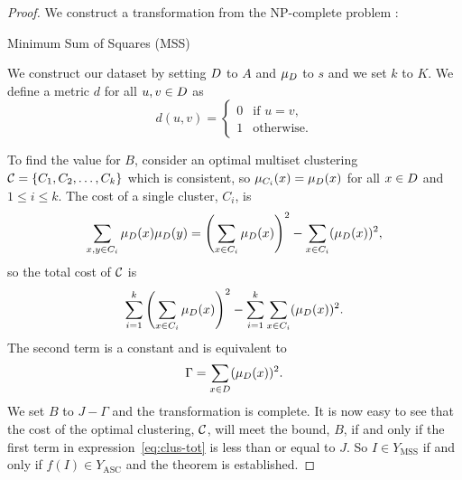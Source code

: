 \begin{proof}
  We construct a transformation from the NP-complete problem
  \citep{gareyjohnson79}:
  \begin{problem}{Minimum Sum of Squares (MSS)}
  \end{problem}
  We construct our dataset by setting $D$ to $A$ and $\mu_{D}$ to $s$
  and we set $k$ to $K$.  We define a metric $d$ for all $u,v \in D$ as
  \begin{equation*}
    d(u,v) =
    \begin{cases}
      0 & \text{if $u=v$,}\\
      1 & \text{otherwise.}
    \end{cases}
  \end{equation*}

  To find the value for $B$, consider an optimal multiset clustering
  $\mathcal{C}=\{C_1,C_2,\dotsc,C_k\}$ which is consistent, so
  $\mu_{C_i}(x)=\mu_{D}(x)$ for all $x \in D$ and $1 \leq i \leq k$.
  The cost of a single cluster, $C_i$, is
  \begin{equation*}
    \sum_{x,y \in C_i} \mu_{D}(x)\mu_{D}(y)
    = \left(\sum_{x \in C_i} \mu_{D}(x)\right)^2
    - \sum_{x \in C_i} (\mu_{D}(x))^2,
  \end{equation*}
  so the total cost of $\mathcal{C}$ is
  \begin{equation}
    \label{eq:clus-tot}
    \sum_{i=1}^{k}\left(\sum_{x \in C_i} \mu_{D}(x)\right)^2
    - \sum_{i=1}^{k}\sum_{x \in C_i} (\mu_{D}(x))^2.
  \end{equation}
  The second term is a constant and is equivalent to
  \begin{equation*}
    \Gamma = \sum_{x \in D} (\mu_{D}(x))^2.
  \end{equation*}
  We set $B$ to $J-\Gamma$ and the transformation is complete.  It is now easy
  to see that the cost of the optimal clustering, $\mathcal{C}$, will meet the
  bound, $B$, if and only if the first term in expression~\eqref{eq:clus-tot}
  is less than or equal to $J$.  So $I \in Y_{\text{MSS}}$ if and only if
  $f(I) \in Y_{\text{ASC}}$ and the theorem is established.
\end{proof}


